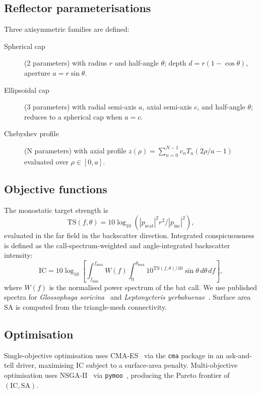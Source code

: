 \documentclass[preprint,12pt]{elsarticle}
\begin{document}
\subsection{Reflector parameterisations}

Three axisymmetric families are defined:
\begin{description}
\item[Spherical cap] (2 parameters) with radius $r$ and half-angle $\theta$; depth $d = r(1 - \cos\theta)$, aperture $a = r \sin\theta$.
\item[Ellipsoidal cap] (3 parameters) with radial semi-axis $a$, axial semi-axis $c$, and half-angle $\theta$; reduces to a spherical cap when $a = c$.
\item[Chebyshev profile] (N parameters) with axial profile $z(\rho) = \sum_{n=0}^{N-1} c_n T_n(2\rho/a - 1)$ evaluated over $\rho \in [0, a]$.
\end{description}

\subsection{Objective functions}

The monostatic target strength is
\begin{equation}
\mathrm{TS}(f, \theta) = 10 \log_{10} \left( |p_{\mathrm{scat}}|^2 r^2 / |p_{\mathrm{inc}}|^2 \right),
\end{equation}
evaluated in the far field in the backscatter direction. Integrated conspicuousness is defined as the call-spectrum-weighted and angle-integrated backscatter intensity:
\begin{equation}
\mathrm{IC} = 10 \log_{10} \left[ \int_{f_{\min}}^{f_{\max}} W(f) \int_0^{\theta_{\max}} 10^{\mathrm{TS}(f,\theta)/10} \sin\theta \, d\theta \, df \right],
\end{equation}
where $W(f)$ is the normalised power spectrum of the bat call. We use published spectra for \textit{Glossophaga soricina}~\cite{Simon2006} and \textit{Leptonycteris yerbabuenae}~\cite{GonzalezTerrazas2016}. Surface area $\mathrm{SA}$ is computed from the triangle-mesh connectivity.

\subsection{Optimisation}

Single-objective optimisation uses CMA-ES~\cite{Hansen2001} via the \texttt{cma} package in an ask-and-tell driver, maximising IC subject to a surface-area penalty. Multi-objective optimisation uses NSGA-II~\cite{Deb2002} via \texttt{pymoo}~\cite{pymoo}, producing the Pareto frontier of $(\mathrm{IC}, \mathrm{SA})$.
\end{document}
